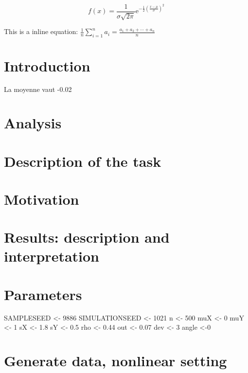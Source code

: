 \documentclass[11pt,]{article}
\begin{document}
\[
f(x)=\frac{1}{\sigma \sqrt{2 \pi}} \mathrm{e}^{-\frac{1}{2}\left(\frac{x-\mu}{\sigma}\right)^{2}}
\]

This is a inline  equation:
\(\frac{1}{n} \sum_{i=1}^{n} a_{i}=\frac{a_{1}+a_{2}+\cdots+a_{n}}{n}\)

\hypertarget{introduction}{%
\section{Introduction}\label{introduction}}

La moyenne vaut -0.02

\hypertarget{analysis}{%
\section{Analysis}\label{analysis}}

\hypertarget{description-of-the-task}{%
\section{Description of the task}\label{description-of-the-task}}

\hypertarget{motivation}{%
\section{Motivation}\label{motivation}}

\hypertarget{results-description-and-interpretation}{%
\section{Results: description and
interpretation}\label{results-description-and-interpretation}}

\hypertarget{parameters}{%
\section{Parameters}\label{parameters}}

SAMPLESEED \textless{}- 9886 SIMULATIONSEED \textless{}- 1021 n
\textless{}- 500 muX \textless{}- 0 muY \textless{}- 1 sX \textless{}-
1.8 sY \textless{}- 0.5 rho \textless{}- 0.44 out \textless{}- 0.07 dev
\textless{}- 3 angle \textless{}-0

\hypertarget{generate-data-nonlinear-setting}{%
\section{Generate data, nonlinear
setting}\label{generate-data-nonlinear-setting}}
\end{document}
